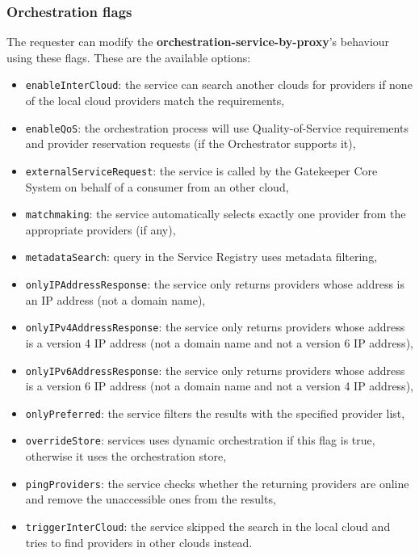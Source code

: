 \documentclass[a4paper]{arrowhead}
\begin{document}
\subsubsection{Orchestration flags}

The requester can modify the \textbf{orchestration-service-by-proxy}'s behaviour using these flags. These are the available options:

\begin{itemize}
    \item \texttt{enableInterCloud}: the service can search another clouds for providers if none of the local cloud providers match the requirements,
    \item \texttt{enableQoS}: the orchestration process will use Quality-of-Service requirements and provider reservation requests (if the Orchestrator supports it),
    \item \texttt{externalServiceRequest}: the service is called by the Gatekeeper Core System on behalf of a consumer from an other cloud,
    \item \texttt{matchmaking}: the service automatically selects exactly one provider from the appropriate providers (if any),
    \item \texttt{metadataSearch}: query in the Service Registry uses metadata filtering,
    \item \texttt{onlyIPAddressResponse}: the service only returns providers whose address is an IP address (not a domain name),
    \item \texttt{onlyIPv4AddressResponse}: the service only returns providers whose address is a version 4 IP address (not a domain name and not a version 6 IP address),
    \item \texttt{onlyIPv6AddressResponse}: the service only returns providers whose address is a version 6 IP address (not a domain name and not a version 4 IP address),
    \item \texttt{onlyPreferred}: the service filters the results with the specified provider list,
    \item \texttt{overrideStore}: services uses dynamic orchestration if this flag is true, otherwise it uses the orchestration store,
    \item \texttt{pingProviders}: the service checks whether the returning providers are online and remove the unaccessible ones from the results,
    \item \texttt{triggerInterCloud}: the service skipped the search in the local cloud and tries to find providers in other clouds instead.
\end{itemize}
\end{document}
